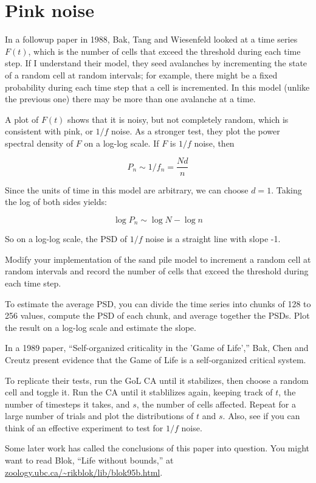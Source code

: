 \documentclass[10pt]{book}
\begin{document}
\section{Pink noise}

In a followup paper in 1988, Bak, Tang and Wiesenfeld looked
at a time series $F(t)$, which is the number of cells that
exceed the threshold during each time step.  If I understand
their model, they seed avalanches by incrementing the state
of a random cell at random intervals; for example, there might
be a fixed probability during each time step that a cell
is incremented.  In this model (unlike the previous one) there
may be more than one avalanche at a time.

A plot of $F(t)$ shows that it is noisy, but not completely
random, which is consistent with pink, or $1/f$ noise.
As a stronger test, they plot the power spectral density of
$F$ on a log-log scale.  If $F$ is $1/f$ noise, then

\[ P_n \sim 1 / f_n = \frac{N d}{n} \]

Since the units of time in this model are arbitrary, we
can choose $d=1$.  Taking the log of both sides yields:

\[ \log P_n \sim \log N - \log n \]

So on a log-log scale, the PSD of $1/f$ noise is a straight
line with slope -1.

\begin{ex}

Modify your implementation of the sand pile model to increment
a random cell at random intervals and record the number of cells
that exceed the threshold during each time step.

To estimate the average PSD, you can divide the time series into
chunks of 128 to 256 values, compute the PSD of each chunk, and
average together the PSDs.  Plot the result on a log-log scale
and estimate the slope.

\end{ex}


\begin{ex}

In a 1989 paper, ``Self-organized criticality in the 'Game of Life',''
Bak, Chen and Creutz present evidence that the Game of Life
is a self-organized critical system.

To replicate their tests, run the GoL CA until it stabilizes,
then choose a random cell and toggle it.  Run the CA until
it stablilizes again, keeping track of $t$, the number
of timesteps it takes, and $s$, the number of cells affected.
Repeat for a large number of trials and plot the distributions
of $t$ and $s$.  Also, see if you can think of an effective
experiment to test for $1/f$ noise.

Some later work has called the conclusions of this paper into
question.  You might want to read Blok, ``Life without bounds,''
at \url{zoology.ubc.ca/~rikblok/lib/blok95b.html}.

\end{ex}
\end{document}
